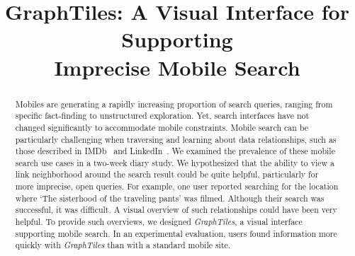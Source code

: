 \documentclass{sigchi}
\begin{document}
\title{GraphTiles: A Visual Interface for Supporting \\Imprecise Mobile Search}
%


\maketitle

\toappear

\begin{abstract}
Mobiles are generating a rapidly increasing proportion of search queries, ranging from specific fact-finding to unstructured exploration. Yet, search interfaces have not changed significantly to accommodate mobile constraints. Mobile search can be particularly challenging when traversing and learning about data relationships, such as those described in IMDb~\cite{imdb} and LinkedIn~\cite{linkedin}. We examined the prevalence of these mobile search use cases in a two-week diary study. We hypothesized that the ability to view a link neighborhood around the search result could be quite helpful, particularly for more imprecise, open queries. For example, one user reported searching for the location where `The sisterhood of the traveling pants' was filmed. Although their search was successful, it was difficult. A visual overview of such relationships could have been very helpful. To provide such overviews, we designed \textit{GraphTiles}, a visual interface supporting mobile search. In an experimental evaluation, users found information more quickly with \textit{GraphTiles} than with a standard mobile site.
\end{abstract}
\end{document}
